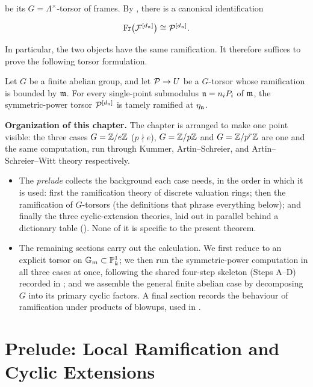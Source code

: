 be its $G = \Lambda^\times$-torsor of frames. By
,
there is a canonical identification

\[
    \operatorname{Fr}\bigl(\mathcal{F}^{[d_{\mathfrak{n}}]}\bigr)
        \cong \mathcal{P}^{[d_{\mathfrak{n}}]}.
\]

In particular, the two objects have the same ramification. It therefore
suffices to prove the following torsor formulation.

\begin{theorem}\label{theorem:torsors_after_blowup_is_tame:reorg}
Let $G$ be a finite abelian group, and let $\mathcal{P} \to U$ be a $G$-torsor whose
ramification is bounded by $\mathfrak{m}$. For every single-point submodulus
$\mathfrak{n} = n_iP_i$ of $\mathfrak{m}$, the symmetric-power torsor
$\mathcal{P}^{[d_{\mathfrak{n}}]}$ is tamely ramified at $\eta_{\mathfrak{n}}$.
\end{theorem}

\medskip
\noindent\textbf{Organization of this chapter.}
The chapter is arranged to make one point visible: the three cases
$G = \mathbb{Z}/e\mathbb{Z}$ ($p \nmid e$), $G = \mathbb{Z}/p\mathbb{Z}$ and $G = \mathbb{Z}/p^r\mathbb{Z}$ are one and the
same computation, run through Kummer, Artin--Schreier, and
Artin--Schreier--Witt theory respectively.
\begin{itemize}
  \item The \emph{prelude} collects the background each case needs, in the
  order in which it is used: first the ramification theory of discrete
  valuation rings; then the ramification of $G$-torsors (the definitions that
  phrase everything below); and finally the three cyclic-extension theories,
  laid out in parallel behind a dictionary table
  (). None of it is specific to the
  present theorem.
  \item The remaining sections carry out the calculation. We first reduce
   to an explicit torsor on
  $\mathbb{G}_m \subset \mathbb{P}^1_k$; we then run the symmetric-power computation in all
  three cases at once, following the shared four-step skeleton (Steps A--D)
  recorded in ; and we assemble
  the general finite abelian case by decomposing $G$ into its primary cyclic
  factors. A final section records the behaviour of ramification under products
  of blowups, used in .
\end{itemize}


\section{Prelude: Local Ramification and Cyclic Extensions}

